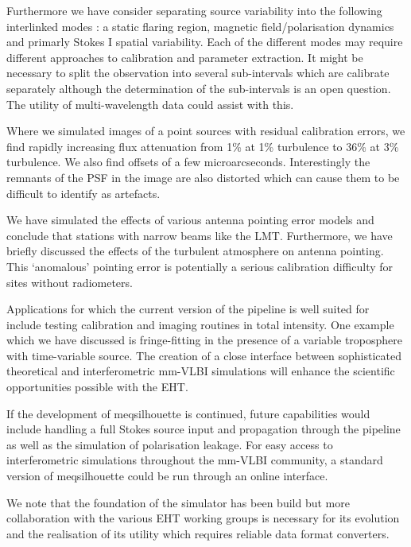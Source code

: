Furthermore we have consider separating source variability into the following interlinked modes : a static flaring region, magnetic field/polarisation dynamics and primarly Stokes I spatial variability. Each of the different modes may require different approaches to calibration and parameter extraction. It might be necessary to split the observation into several sub-intervals which are calibrate separately although the determination of the sub-intervals is an open question. The utility of multi-wavelength data could assist with this. 


Where we simulated images of a point sources with residual calibration errors, we find rapidly increasing flux attenuation from 1\% at 1\% turbulence to 36\% at 3\% turbulence. We also find offsets of a few microarcseconds. Interestingly the remnants of the PSF in the image are also distorted which can cause them to be difficult to identify as artefacts.


We have simulated the effects of various antenna pointing error models and conclude that stations with narrow beams like the LMT.  
Furthermore, we have briefly discussed the effects of the turbulent atmosphere on antenna pointing. This `anomalous' pointing error is potentially a serious calibration difficulty for sites without radiometers.
%


Applications for which the current version of the pipeline is well suited for include testing calibration and imaging routines in total intensity. One example which we have discussed is fringe-fitting in the presence of a variable troposphere with time-variable source.  
The creation of a close interface between sophisticated theoretical and interferometric mm-VLBI simulations will enhance the scientific opportunities possible with the EHT. 

If the development of {\sc meqsilhouette} is continued, future capabilities would include handling a full Stokes source input and propagation through the pipeline as well as the simulation of polarisation leakage.  For easy access to interferometric simulations throughout the mm-VLBI community, a standard version of {\sc meqsilhouette} could be run through an online interface.  


We note that the foundation of the simulator has been build but more collaboration with the various EHT working groups is necessary for its evolution and the realisation of its utility which requires reliable data format converters.











